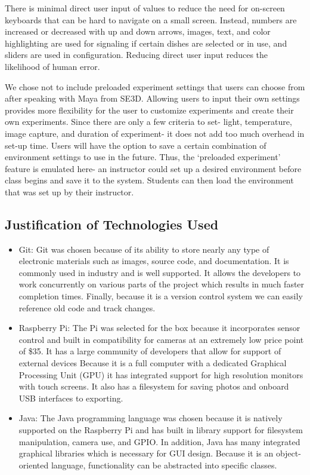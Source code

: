 There is minimal direct user input of values to reduce the need for on-screen keyboards that can be hard to navigate on a small screen. Instead, numbers are increased or decreased with up and down arrows, images, text, and color highlighting are used for signaling if certain dishes are selected or in use, and sliders are used in configuration. Reducing direct user input reduces  the likelihood of human error.

We chose not to include preloaded experiment settings that users can choose from after speaking with Maya from SE3D. Allowing users to input their own settings provides more flexibility for the user to customize experiments and create their own experiments. Since there are only a few criteria to set- light, temperature, image capture, and duration of experiment- it does not add too much overhead in set-up time. Users will have the option to save a certain combination of environment settings to use in the future. Thus, the `preloaded experiment' feature is emulated here- an instructor could set up a desired environment before class begins and save it to the system. Students can then load the environment that was set up by their instructor. 


\subsection{Justification of Technologies Used}
\begin{itemize}
	\item Git: Git was chosen because of its ability to store nearly any type of electronic materials such as images, source code, and documentation. It is commonly used in industry and is well supported. It allows the developers to work concurrently on various parts of the project which results in much faster completion times. Finally, because it is a version control system we can easily reference old code and track changes.

	\item Raspberry Pi: The Pi was selected for the box because it incorporates sensor control and built in compatibility for cameras at an extremely low price point of \$35. It has a large community of developers that allow for support of external devices Because it is a full computer with a dedicated Graphical Processing Unit (GPU) it has integrated support for high resolution monitors with touch screens. It also has a filesystem for saving photos and onboard USB interfaces to exporting.

	\item Java: The Java programming language was chosen because it is natively supported on the Raspberry Pi and has built in library support for filesystem manipulation, camera use, and GPIO. In addition, Java has many integrated graphical libraries which is necessary for GUI design. Because it is an object-oriented language, functionality can be abstracted into specific classes.
\end{itemize}
